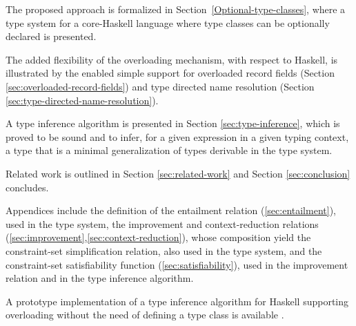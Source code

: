 The proposed approach is formalized in
Section~\ref{Optional-type-classes}, where a type system for a
core-Haskell language where type classes can be optionally declared is
presented.

The added flexibility of the overloading mechanism, with respect to
Haskell, is illustrated by the enabled simple support for overloaded
record fields (Section \ref{sec:overloaded-record-fields}) and type
directed name resolution (Section
\ref{sec:type-directed-name-resolution}).

A type inference algorithm is presented in Section
\ref{sec:type-inference}, which is proved to be sound and to infer,
for a given expression in a given typing context, a type that is a
minimal generalization of types derivable in the type system.


Related work is outlined in Section \ref{sec:related-work} and Section
\ref{sec:conclusion} concludes.

Appendices include the definition of the entailment relation
(\ref{sec:entailment}), used in the type system, the improvement and
context-reduction relations
(\ref{sec:improvement},\ref{sec:context-reduction}), whose composition
yield the constraint-set simplification relation, also used in the
type system, and the constraint-set satisfiability function
(\ref{sec:satisfiability}), used in the improvement relation and in
the type inference algorithm.

A prototype implementation of a type inference algorithm for Haskell
supporting overloading without the need of defining a type class is
available \cite{opt-rep}.
